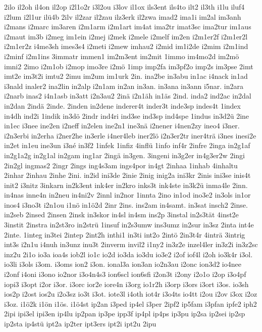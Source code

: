 {2ilo
il2oh
il4on
il2op
i2l1o2r
i3l2ou
i3lov
il1ox
ils3ent
ils4to
ilt2
il3th
i1lu
iluf4
i2lum
i2l1ur
ilü4b
2ilv
il2zar
il2zau
ilz3erk
il2zwa
imad2
ima1i
im2al
im3anh
i2mans
i2marc
im3aren
i2m1arm
i2m1art
im4at
ima2tr
imat3sc
ima2tur
im1aus
i2maut
im3b
i2meg
im1ein
i2mej
i2mek
i2mele
i2melf
im2en
i2m1er2f
i2m1er2l
i2m1er2z
i4me3sh
imes3s4
i2meti
i2mew
imhau2
i2mid
im1i2de
i2mim
i2m1ind
i2minf
i2m1ins
3immatr
immen1
im2m3ent
im2mit
1immo
im4mo2d
im2mö
imni2
2imo
i2m1ob
i2mop
imo3re
i2mö
1imp
imp2fa
im3pf2o
imp2s
im3pse
2imt
imt2e
im3t2i
imtu2
2imu
im2um
im1urk
2in.
ina2be
in3abu
in1ac
i4nack
in1ad
i3nald
inaler2
ina2lin
in2alp
i2n1am
in2an
in3an.
in3ana
in3ann
i5nar.
in2ara
i2narb
inas2
i4n1asb
in3att
i2n3au2
2inä
i2n1äh
in1äs
2ind.
inda2
ind2ac
in2dal
in2dan
2indä
2inde.
2inden
in2dene
inderer4t
inder3t
inde3sp
indes4t
1index
in4dh
ind2i
1indik
in3dö
2indr
ind4ri
ind3se
ind3sp
ind4spe
1indus
in3d2ü
2ine
in1ec
i3nee
ine2en
i2neff
in2elen
ine2n1
ine3nä
i2nener
i4nen2zy
ineo4
i3ner.
i2n3erbi
in2erha
i2ner2he
in3erle
i4ner4leb
iner2lö
i2n3er2tr
iner4trä
i3nes
inesi2e
in2et
in1eu
ine3un
i3né
in3f2
1infek
1infiz
4inflü
1info
inf4r
2infre
2inga
in2g1af
in2g1a2g
in2g1al
in2gam
ing1ar
2ingä
in3gen.
3ingeni
in3g2er
in4g3er2w
2ingi
2in2gl
ingmas2
2ingr
2ings
ing4s3am
ings4por
in4gt
2inhaa
1inhab
4inhaltu
2inhar
2inhau
2inhe
2ini.
in2id
ini3de
2inie
2inig
inig2a
ini3kr
2inis
ini3se
inis4t
init2
i3nitz
3inkarn
in2k3ent
ink4er
in2kro
inks3t
ink4ste
in3k2ü
inma4le
2inn.
in4nas
inne4n
in2neu
in4ni2v
2innl
in2nor
1innta
2ino
in1od
ino3e2
in3ols
in1or
inos4
i3no3t
i2n1ou
i1nö
in1ö2d
2inr
2ins.
ins2am
in4samt.
in3sat
insch2
2inse.
in2seb
2insed
2insen
2insk
in3skor
in4sl
in4sm
ins2p
3instal
in2s3tät
4inst2e
3instit
2instra
in2st3ro
in2strü
1insuf
in2s3umw
ins3umz
in2sur
in3sz
2inta
int4e
2inte.
1integ
in3tei
2intep
2int2h
inthi1
in3ti
int2o
2intö
2in3t4r
4inträ
3intrig
int3s
i2n1u
i4nuh
in3unz
inu3t
2inverm
invil2
i1ny2
in3z2e
inzel4ler
in3z2i
in3z2sc
inz2u
2i1o
io3a
ioa4s
iob2l
io1c
io2d
io3da
io3du
io3e2
i2of
iof4l
i2oh
io3k4r
i3ol.
io3li
i3ols
i3om.
i3oms
ion2
i3on.
ional3a
ion3an
io2n3au
i2onc
ion3d2
io4nee
i2onf
i4oni
i3ono
io2nor
i3o4n4s3
ion6scl
ion6sfi
i2on3t
i2ony
i2o1o
i2op
i3o4pf
iopi3
i3opt
i2or
i3or.
i3orc
ior2e
iore4n
i3org
io1r2h
i3orp
i3ors
i3ort
i3os.
io3sh
ios2p
i2ost
ios2u
i2o3sz
io3t
i3ot.
iote3l
i4oth
iot4r
i3o4ts
io4tt
i2ou
i2ov
i3ox
i2oz
i3oz.
i1ö2k
i1ön
i1ös.
i1ö4st
ip2an
i3ped
ip4el
i3per
2ipf2
ip5fam
i3pfan
ipfe2
iph2
2ipi
ipi3el
ipi3en
ip4lu
ip2pan
ip3pe
ipp3f
ip4pl
ip4ps
ip3pu
ip2sa
ip2sei
ip2sp
ip2sta
ip4stü
ipt2a
ip2ter
ipt3ers
ipt2i
ipt2u
2ipu
}
